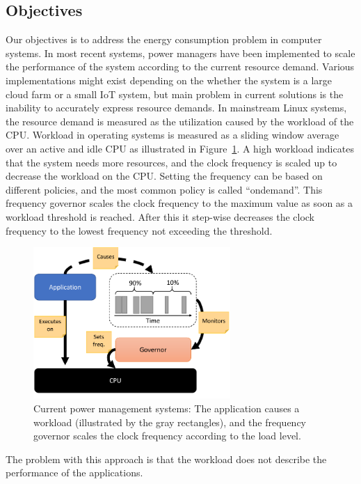 \documentclass{article}
\begin{document}
\subsection{Objectives}
Our objectives is to address the energy consumption problem in computer systems.
In most recent systems, power managers have been implemented to scale the performance of the system according to the current resource demand.
Various implementations might exist depending on the whether the system is a large cloud farm or a small IoT system, 
but main problem in current solutions is the inability to accurately express resource demands.
In mainstream Linux systems, the resource demand is measured as the utilization caused by the workload of the CPU. 
Workload in operating systems is measured as a sliding window average over an active and idle CPU as illustrated in Figure~\ref{fig:workload}. 
A high workload indicates that the system needs more resources, and the clock frequency is scaled up to decrease the workload on the CPU.
Setting the frequency can be based on different policies, and the most common policy is called ``ondemand''\cite{ondemand}.
This frequency governor scales the clock frequency to the maximum value as soon as a workload threshold is reached.
After this it step-wise decreases the clock frequency to the lowest frequency not exceeding the threshold.\smallskip 
\begin{figure}
  \begin{center}
    \vspace{-0.8cm}
    \includegraphics[width=7.5cm]{fig/WorkloadMonitor.png}
  \end{center}
  \caption{Current power management systems: The application causes a workload (illustrated by the gray rectangles), and the frequency governor scales the clock frequency according to the load level.}
  \label{fig:workload}
\end{figure}
The problem with this approach is that the workload does not describe the performance of the applications.
\end{document}
